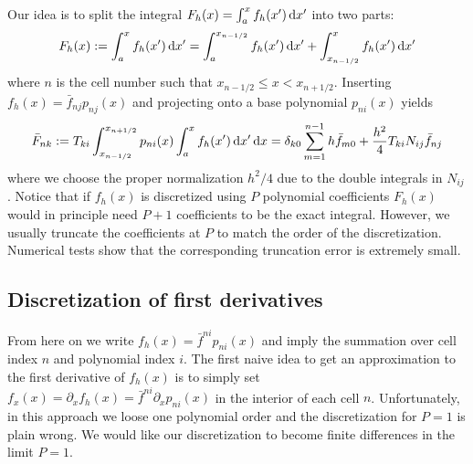 Our idea is to split the integral $F_h(x) = \int_a^x f_h(x')\,\mathrm{d}x'$ into two parts:
\begin{align}
F_h(x):=\int_a^x f_h(x') \,\mathrm{d}x' = \int_a^{x_{n-1/2}} f_h(x')\,\mathrm{d}x' + \int_{x_{n-1/2}}^x f_h(x') \,\mathrm{d}x'
\end{align}
where $n$ is the cell number such that $x_{n-1/2}\leq x < x_{n+1/2}$.
Inserting $f_h(x) = \bar f_{nj} p_{nj}(x)$ and projecting onto a base polynomial $p_{ni}(x)$ yields
\begin{align}
\bar F_{nk} := T_{ki}\int_{x_{n-1/2}}^{x_{n+1/2}} p_{ni}(x) \int_a^x f_h(x') \,\mathrm{d}x'\,\mathrm{d}x
= \delta_{k0} \sum_{m=1}^{n-1} h\bar f_{m0} + \frac{h^2}{4}T_{ki}N_{ij} \bar f_{nj}
\end{align}
where we choose the proper normalization $h^2/4$ due to the double integrals in $N_{ij}$.
Notice that if $f_h(x)$ is discretized using $P$ polynomial coefficients $F_h(x)$ would in
principle need $P+1$ coefficients to be the exact integral.
However, we usually truncate the coefficients at $P$ to match the order of the discretization.
Numerical tests show that the corresponding truncation error is extremely small.

\subsection{ Discretization of first derivatives} \label{sec:firstderivatives}
From here on we write
$ f_h(x) = \bar f^{ni}p_{ni}(x)$ and imply the summation over cell index $n$ and polynomial
index $i$.
The first naive idea to get an approximation to the first derivative of $f_h(x)$
is to simply set $f_x(x) = \partial_x f_h(x) = \bar f^{ni}\partial_x p_{ni}(x)$ in 
the interior of each cell $n$. 
Unfortunately, in this approach we loose one polynomial order and the discretization for
$P=1$ is plain wrong. We would 
like our discretization to become finite differences in the limit $P=1$.

